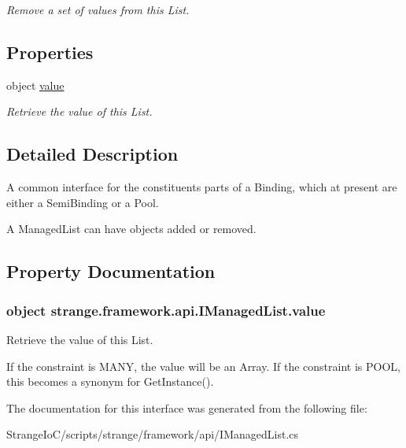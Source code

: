 \begin{DoxyCompactItemize}
\begin{DoxyCompactList}\small\item\em Remove a set of values from this List. \end{DoxyCompactList}\end{DoxyCompactItemize}
\subsection*{Properties}
\begin{DoxyCompactItemize}
\item 
object \hyperlink{interfacestrange_1_1framework_1_1api_1_1_i_managed_list_a563724c81cc8fe5ec08025fe94e9f351}{value}
\begin{DoxyCompactList}\small\item\em Retrieve the value of this List. \end{DoxyCompactList}\end{DoxyCompactItemize}


\subsection{Detailed Description}
A common interface for the constituents parts of a Binding, which at present are either a Semi\-Binding or a Pool. 

A Managed\-List can have objects added or removed. 

\subsection{Property Documentation}
\hypertarget{interfacestrange_1_1framework_1_1api_1_1_i_managed_list_a563724c81cc8fe5ec08025fe94e9f351}{
\subsubsection[{value}]{\setlength{\rightskip}{0pt plus 5cm}object strange.\-framework.\-api.\-I\-Managed\-List.\-value\hspace{0.3cm}{\ttfamily [get]}}}\label{interfacestrange_1_1framework_1_1api_1_1_i_managed_list_a563724c81cc8fe5ec08025fe94e9f351}


Retrieve the value of this List. 

If the constraint is M\-A\-N\-Y, the value will be an Array. If the constraint is P\-O\-O\-L, this becomes a synonym for Get\-Instance(). 

The documentation for this interface was generated from the following file\-:\begin{DoxyCompactItemize}
\item 
Strange\-Io\-C/scripts/strange/framework/api/I\-Managed\-List.\-cs\end{DoxyCompactItemize}
